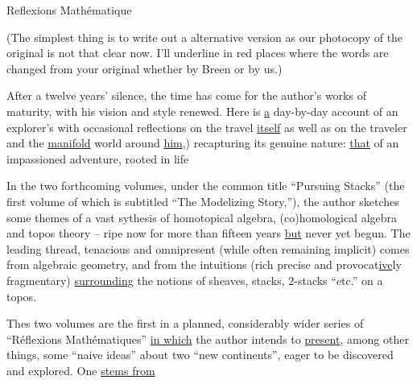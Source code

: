 \begin{center}Reflexions Mathématique\end{center}

(The simplest thing  is to write out a  alternative version as our photocopy of the original is not that clear now. I'll underline in red places where the words are changed from your original whether by Breen or by us.)

After a twelve years' silence, the time has come for the author's works of maturity, with his vision and style renewed. Here is \uline{a} day-by-day account of an explorer's   with occasional reflections on the travel \uline{itself} \unsure{((|(}as well as on the traveler and the \uline{manifold} world around \uline{him},)  recapturing its genuine nature: \uline{that} of an impassioned adventure, rooted in life

In the two forthcoming volumes, under the common title ``Pursuing Stacks'' (the first volume of which is subtitled ``The Modelizing Story,''), the author sketches some themes of a vast sythesis of homotopical algebra, (co)homological algebra and topos theory -- ripe now for more than fifteen years \uline{but} never yet begun. The leading thread, tenacious and omnipresent (while often remaining implicit) comes from algebraic geometry, and from the intuitions (rich precise and provocat\uline{ive}ly fragmentary) \uline{surrounding} the notions of sheaves, stacks, $2$-stacks ``etc.'' on a topos.

Thes two volumes are the first in a planned, considerably wider series of ``Réflexions Mathématiques'' \uline{in which} the author intends to \uline{present}, among other things, some ``naive ideas'' about two ``new continents'', eager to be discovered and explored. One \uline{stems from}
